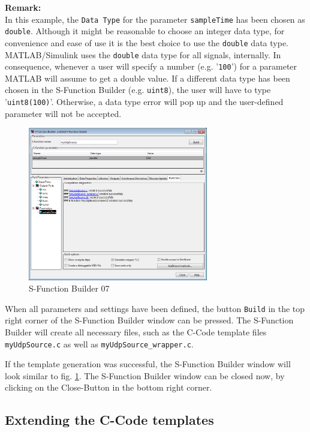 \textbf{Remark:}\\
In this example, the \texttt{Data Type} for the parameter \texttt{sampleTime} has been chosen as \texttt{double}. Although it might be reasonable to choose an integer data type, for convenience and ease of use it is the best choice to use the \texttt{double} data type. MATLAB/Simulink uses the \texttt{double} data type for all signals, internally. In consequence, whenever a user will specify a number (e.g. '\texttt{100}') for a parameter MATLAB will assume to get a double value. If a different data type has been chosen in the S-Function Builder (e.g. \texttt{uint8}), the user will have to type '\texttt{uint8(100)}'. Otherwise, a data type error will pop up and the user-defined parameter will not be accepted.

\begin{figure}[H]
    \centering
    \includegraphics[width=0.7\textwidth]{fig/ch-matlab-lib/sFuncBuilder_matlabBuilder_04_success}
    \caption{S-Function Builder 07}
    \label{fig:udpMatlab:simulinkBlock:builder:step7}
\end{figure}

When all parameters and settings have been defined, the button \texttt{Build} in the top right corner of the S-Function Builder window can be pressed. The S-Function Builder will create all necessary files, such as the C-Code template files \texttt{myUdpSource.c} as well as \texttt{myUdpSource\_wrapper.c}.

If the template generation was successful, the S-Function Builder window will look similar to fig. \ref{fig:udpMatlab:simulinkBlock:builder:step7}. The S-Function Builder window can be closed now, by clicking on the Close-Button in the bottom right corner.

\subsection{Extending the C-Code templates}
\label{sec:udpMatlab:simulinkBlock:extendTemplates}

